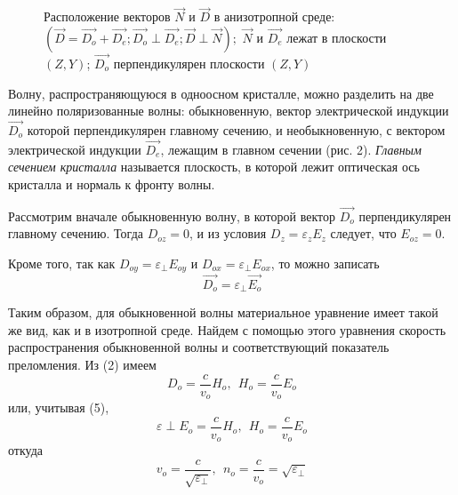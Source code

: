 \documentclass[14pt]{article}
\begin{document}
\begin{figure}[h!]
	\caption{Расположение векторов $\vec{N}$ и $\vec{D}$ в анизотропной среде: $(\vec{D} = \vec{D_o} + \vec{D_e}; \vec{D_o}\perp\vec{D_e}; \vec{D}\perp\vec{N});$
			 $\vec{N}$ и $\vec{D_e}$ лежат в плоскости $(Z,Y)$; $\vec{D_o}$ перпендикулярен плоскости $(Z,Y)$}
	\label{fig:image}
\end{figure}

Волну, распространяющуюся в одноосном кристалле, можно
разделить на две линейно
поляризованные волны: обыкновенную,
вектор электрической индукции
$\vec{D_o}$ которой перпендикулярен
главному сечению, и необыкновенную, с вектором
электрической индукции $\vec{D_e}$, лежащим
в главном сечении (рис. 2).
\textsl{Главным сечением кристалла}
называется плоскость, в которой
лежит оптическая ось кристалла
и нормаль к фронту волны.

Рассмотрим вначале обыкновенную волну, в которой вектор
$\vec{D_o}$ перпендикулярен главному сечению.
Тогда $D_{oz} = 0$, и из условия $D_z = \varepsilon_zE_z$ следует, что $E_{oz} = 0$.

Кроме того, так как $D_{oy} = \varepsilon_\perp E_{oy}$ и $D_{ox} = \varepsilon_\perp E_{ox}$, то можно записать
\begin{equation}
	\vec{D_o} = \varepsilon_\perp\vec{E_o}
\end{equation}

Таким образом, для обыкновенной волны материальное уравнение
имеет такой же вид, как и в изотропной среде. Найдем с помощью этого
уравнения скорость распространения обыкновенной волны
и соответствующий показатель преломления. Из (2) имеем
$$
	D_o = \frac{c}{v_o}H_o,~~H_o = \frac{c}{v_o}E_o
$$
\noindent или, учитывая (5),
$$
	\varepsilon\perp E_o = \frac{c}{v_o}H_o,~~H_o = \frac{c}{v_o}E_o
$$
\noindent откуда
$$
	v_o = \frac{c}{\sqrt{\varepsilon_\perp}},~~n_o = \frac{c}{v_o} = \sqrt{\varepsilon_\perp}
$$
\end{document}
